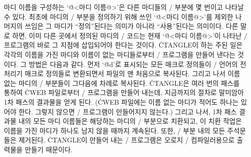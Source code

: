 마디 이름을 구성하는 `\.{@<마디 이름@>}'은 다른 마디들의 \CEE/ 부분에 몇 번이고 나타날 수
있다. 최초에 마디의 \CEE/ 부분을 정의하기 위해 쓰인 `\.{@<마디 이름@>}'를 제외한 나머지의
쓰임은 그 마디가 ``정의''된다는 의미가 아니라 ``사용''된다는 의미이다. 다른 말로 하면,
이미 다른 곳에서 정의된 마디의 \CEE/ 코드는 현재 `\.{@<마디 이름@>}'이 나타난 \CEE/
프로그램의 바로 그 지점에 삽입되어야 한다는 것이다. \.{CTANGLE}이 하는 주된 일은 각각의
이름을 가진 마디와 이름이 없는 마디들로부터 \CEE/ 프로그램을 만들어 낸다는 것이다. 그 방법은
다음과 같다. 먼저 `\.{@d}'로 표시되는 모든 매크로 정의들이 \CEE/ 언어의 전처리기 매크로
정의들로 변환되면서 파일의 맨 처음으로 복사된다. 그리고 나서 이름 없는 마디의 \CEE/ 부분들이
그다음에 차례로 복사된다. \.{CTANGLE}은 여러 번의 패스를 통하여 \.{CWEB} 파일로부터 \CEE/
프로그램을 만들어 내는데, 지금까지의 절차로 말미암아 1차 패스의 결과물을 얻게 된다.
(\.{CWEB} 파일에는 이름 없는 마디가 적어도 하나는 있어야 한다. 그렇지 않으면 \CEE/
프로그램이 만들어지지 않는다.) 그리고 나서, 1차 패스 결과물 내의 모든 마디 이름들은 해당하는
마디의 \CEE/ 부분으로 치환되고, 이 치환 작업은 이름을 가진 마디가 하나도 남지 않을 때까지
계속된다. 또한, \CEE/ 부분 내의 모든 주석문들은 제거된다. \.{CTANGLE}이 만들어 내는
\CEE/ 프로그램은 오로지 \CEE/ 컴파일러용으로 출력물을 만들기 때문이다.

